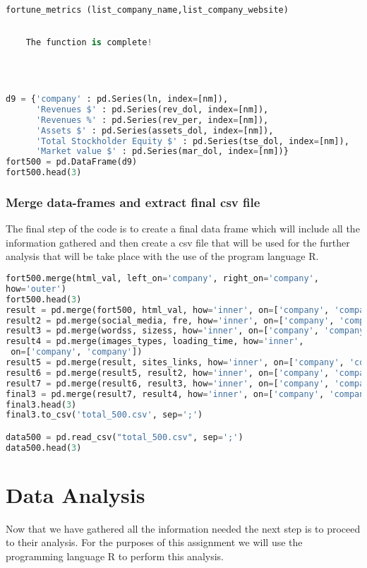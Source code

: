 \documentclass{article}
\begin{document}
\begin{lstlisting}[language=Python]
 
fortune_metrics (list_company_name,list_company_website)
 

    The function is complete!
    



d9 = {'company' : pd.Series(ln, index=[nm]),
      'Revenues $' : pd.Series(rev_dol, index=[nm]),
      'Revenues %' : pd.Series(rev_per, index=[nm]),
      'Assets $' : pd.Series(assets_dol, index=[nm]),
      'Total Stockholder Equity $' : pd.Series(tse_dol, index=[nm]),
      'Market value $' : pd.Series(mar_dol, index=[nm])}
fort500 = pd.DataFrame(d9)    
fort500.head(3)
\end{lstlisting}
\subsubsection{Merge data-frames and extract final csv file}
The final step of the code is to create a final data frame which will include all the information gathered and then create a csv file that will be used for the further analysis that will be take place with the use of the program language R.
\begin{lstlisting}[language=Python]
fort500.merge(html_val, left_on='company', right_on='company',
how='outer')
fort500.head(3)
result = pd.merge(fort500, html_val, how='inner', on=['company', 'company'])
result2 = pd.merge(social_media, fre, how='inner', on=['company', 'company'])
result3 = pd.merge(wordss, sizess, how='inner', on=['company', 'company'])
result4 = pd.merge(images_types, loading_time, how='inner',
 on=['company', 'company'])
result5 = pd.merge(result, sites_links, how='inner', on=['company', 'company'])
result6 = pd.merge(result5, result2, how='inner', on=['company', 'company'])
result7 = pd.merge(result6, result3, how='inner', on=['company', 'company'])
final3 = pd.merge(result7, result4, how='inner', on=['company', 'company'])
final3.head(3)
final3.to_csv('total_500.csv', sep=';')

data500 = pd.read_csv("total_500.csv", sep=';') 
data500.head(3)
\end{lstlisting}
\newpage  
\section{Data Analysis}
Now that we have gathered all the information needed the next step is to proceed to their analysis. For the purposes of this assignment we will use the programming language R to perform this analysis.
\end{document}

